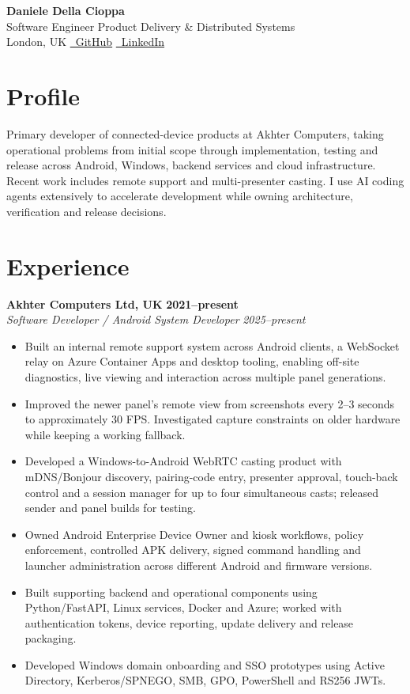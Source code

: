 \documentclass[11pt,a4paper]{article}
\newcommand{\githubicon}{{\color{accent}\faGithub}}
\newcommand{\linkedinicon}{{\color{accent}\faLinkedin}}
\begin{document}
{\Huge\bfseries\color{accent} Daniele Della Cioppa}\\[3pt]
{\large Software Engineer \textbar{} Product Delivery \& Distributed Systems}\\[5pt]
London, UK\quad\textbar\quad
\href{https://github.com/danieledellacioppa}{\githubicon\ GitHub}\quad\textbar\quad
\href{https://www.linkedin.com/in/daniele-della-cioppa-41b062115/}{\linkedinicon\ LinkedIn}

\section*{Profile}
Primary developer of connected-device products at Akhter Computers, taking operational problems from initial scope through implementation, testing and release across Android, Windows, backend services and cloud infrastructure. Recent work includes remote support and multi-presenter casting. I use AI coding agents extensively to accelerate development while owning architecture, verification and release decisions.

\section*{Experience}
\textbf{Akhter Computers Ltd, UK} \hfill \textbf{2021--present}\\[-2pt]
\textit{Software Developer / Android System Developer} \hfill \textit{2025--present}
\begin{itemize}
  \item Built an internal remote support system across Android clients, a WebSocket relay on Azure Container Apps and desktop tooling, enabling off-site diagnostics, live viewing and interaction across multiple panel generations.
  \item Improved the newer panel's remote view from screenshots every 2--3 seconds to approximately 30 FPS. Investigated capture constraints on older hardware while keeping a working fallback.
  \item Developed a Windows-to-Android WebRTC casting product with mDNS/Bonjour discovery, pairing-code entry, presenter approval, touch-back control and a session manager for up to four simultaneous casts; released sender and panel builds for testing.
  \item Owned Android Enterprise Device Owner and kiosk workflows, policy enforcement, controlled APK delivery, signed command handling and launcher administration across different Android and firmware versions.
  \item Built supporting backend and operational components using Python/FastAPI, Linux services, Docker and Azure; worked with authentication tokens, device reporting, update delivery and release packaging.
  \item Developed Windows domain onboarding and SSO prototypes using Active Directory, Kerberos/SPNEGO, SMB, GPO, PowerShell and RS256 JWTs.
\end{itemize}
\end{document}

